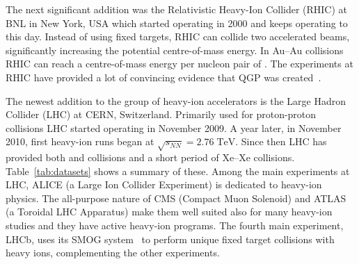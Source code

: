 The next significant addition was the Relativistic Heavy-Ion Collider (RHIC) at BNL in New York, USA which started operating in 2000 and keeps operating to this day. Instead of using fixed targets, RHIC can collide two accelerated beams, significantly increasing the potential centre-of-mass energy. In Au--Au collisions RHIC can reach a centre-of-mass energy per nucleon pair of \unit[200]{\gev}. The experiments at RHIC have provided a lot of convincing evidence that QGP was created~\cite{Adcox:2004mh, Adams:2005dq, Arsene:2004fa, Back:2004je}. 

The newest addition to the group of heavy-ion accelerators is the Large Hadron Collider (LHC) at CERN, Switzerland. Primarily used for proton-proton collisions LHC started operating in November 2009. A year later, in November 2010, first \PbPb heavy-ion runs began at $\sqrt{s_{NN}}=2.76\; \mathrm{TeV}$. Since then LHC has provided both \PbPb and \pPb collisions and a short period of Xe--Xe collisions. Table~\ref{tab:datasets} shows a summary of these. Among the main experiments at LHC, ALICE (a Large Ion Collider Experiment) is dedicated to heavy-ion physics. The all-purpose nature of CMS (Compact Muon Solenoid) and ATLAS (a Toroidal LHC Apparatus) make them well suited also for many heavy-ion studies and they have active heavy-ion programs. The fourth main experiment, LHCb, uses its SMOG system~\cite{Maurice:2017iom} to perform unique fixed target collisions with heavy ions, complementing the other experiments. 


